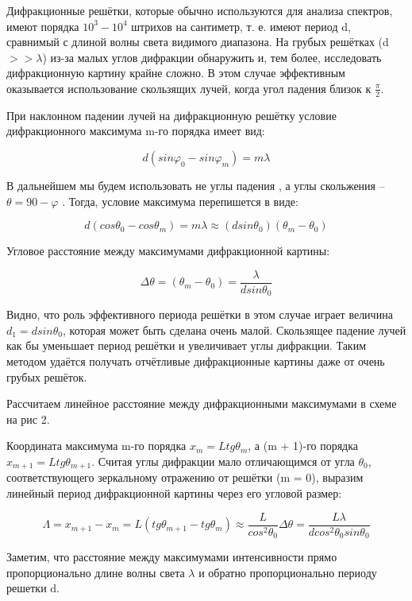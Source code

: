 \documentclass[a4paper,12pt]{article}
\begin{document}
  Дифракционные решётки, которые обычно
используются для анализа спектров, имеют порядка
$10^3 - 10^4$ штрихов на сантиметр, т. е. имеют период d,
сравнимый с длиной волны света видимого
диапазона. На грубых решётках (d $>> \lambda $) из-за
малых углов дифракции обнаружить и, тем
более, исследовать дифракционную картину крайне
сложно. В этом случае эффективным оказывается
использование скользящих лучей, когда угол
падения близок к $\frac{\pi}{2}$.

  При наклонном падении лучей на
дифракционную решётку условие дифракционного
максимума m-го порядка имеет вид:


\[d(sin\varphi_0 - sin\varphi_m) = m\lambda  \]


  В дальнейшем мы будем использовать не углы падения , а углы скольжения – $\theta = 90 - \varphi$ .
  Тогда, условие максимума перепишется в виде:


\[d(cos\theta_0 - cos\theta_m) = m\lambda \approx (d sin\theta_0)(\theta_m - \theta_0) \]


  Угловое расстояние между максимумами дифракционной картины:

\[\Delta \theta = (\theta_m - \theta_0) = \frac{\lambda}{d sin\theta_0}  \]

 Видно, что роль эффективного периода решётки в этом случае играет величина $d_1 = d sin\theta_0$,
которая может быть сделана очень малой. Скользящее падение лучей как бы уменьшает период решётки и увеличивает углы дифракции. Таким методом удаётся получать отчётливые дифракционные картины даже от очень грубых решёток.


  Рассчитаем линейное расстояние между дифракционными максимумами в схеме на рис 2.
  
  Координата максимума m-го порядка $x_m = Ltg\theta_m$, а (m + 1)-го порядка $x_{m+1} = Ltg\theta_{m+1}$. Считая углы дифракции мало отличающимся от угла $\theta_0$, соответствующего зеркальному отражению от решётки (m = 0), выразим линейный период дифракционной картины через его угловой размер:



\[\Lambda = x_{m+1} - x_m = L(tg\theta_{m+1} - tg\theta_m) \approx \frac{L}{cos^2 \theta_0} \Delta \theta = \frac{L\lambda}{d cos^2 \theta_0sin\theta_0} \]


  Заметим, что расстояние между максимумами интенсивности прямо пропорционально длине волны света $\lambda$ и обратно пропорционально периоду решетки d.
\end{document}
